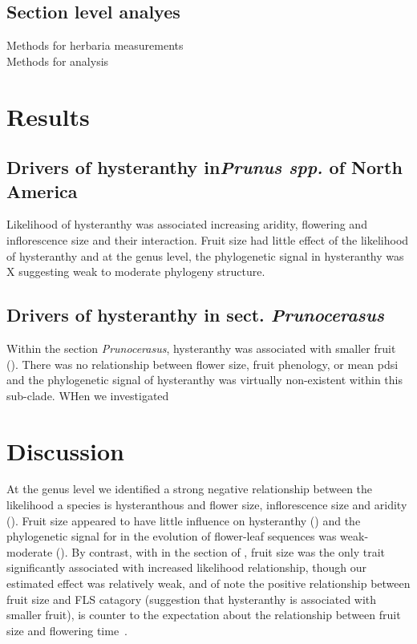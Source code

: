 \documentclass{article}\usepackage[]{graphicx}\usepackage[]{color}
\begin{document}
\subsection{Section level analyes}
Methods for herbaria measurements\\
Methods for analysis\\
\pagebreak

\section*{Results}
\subsection*{Drivers of hysteranthy in\textit{Prunus spp.} of North America}
Likelihood of hysteranthy was associated increasing aridity, flowering and inflorescence size and their interaction. Fruit size had little effect of the likelihood of hysteranthy and at the genus level, the phylogenetic signal in hysteranthy was X suggesting weak to moderate phylogeny structure.


\subsection*{Drivers of hysteranthy in sect. \textit{Prunocerasus} }
Within the section \textit{Prunocerasus}, hysteranthy was associated with smaller fruit (). There was no relationship between flower size, fruit phenology, or mean pdsi and the phylogenetic signal of hysteranthy was virtually non-existent within this sub-clade. WHen we investigated

\section*{Discussion}
At the genus level we identified a strong negative relationship between the likelihood a species is hysteranthous and flower size, inflorescence size and aridity (). Fruit size appeared to have little influence on hysteranthy () and the phylogenetic signal for in the evolution of flower-leaf sequences was weak-moderate ().
By contrast, with in the section of , fruit size was the only trait significantly associated with increased likelihood relationship, though our estimated effect was relatively weak, and of note the positive relationship between fruit size and FLS catagory (suggestion that hysteranthy is associated with smaller fruit), is counter to the expectation about the relationship between fruit size and flowering time\ \citep{}.
\end{document}
